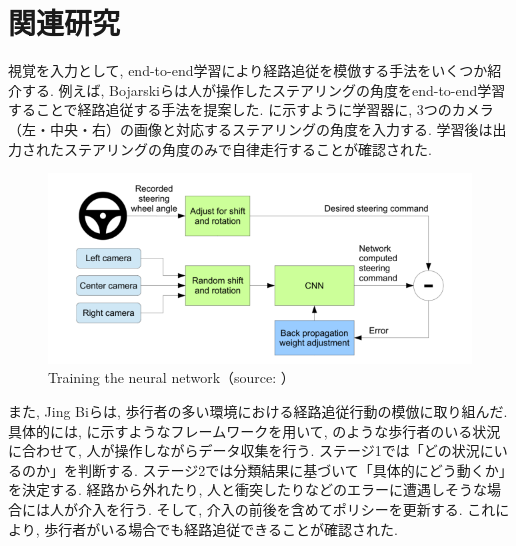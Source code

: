 \section{関連研究}
視覚を入力として, end-to-end学習により経路追従を模倣する手法をいくつか紹介する. 例えば, Bojarskiらは人が操作したステアリングの角度をend-to-end学習することで経路追従する手法を提案した. に示すように学習器に, 3つのカメラ（左・中央・右）の画像と対応するステアリングの角度を入力する. 学習後は出力されたステアリングの角度のみで自律走行することが確認された\cite{bojaski}. 

\begin{figure}[h]
     \centering
     \includegraphics[keepaspectratio, scale=0.45]
     {images/bojaski.png}
     \caption{Training the neural network（source: \cite{bojaski}）}
     \label{Fig:bojaski}
     \end{figure}

また, Jing Biらは, 歩行者の多い環境における経路追従行動の模倣に取り組んだ. 具体的には, に示すようなフレームワークを用いて, のような歩行者のいる状況に合わせて, 人が操作しながらデータ収集を行う. ステージ1では「どの状況にいるのか」を判断する. ステージ2では分類結果に基づいて「具体的にどう動くか」を決定する. 経路から外れたり, 人と衝突したりなどのエラーに遭遇しそうな場合には人が介入を行う. そして, 介入の前後を含めてポリシーを更新する. これにより, 歩行者がいる場合でも経路追従できることが確認された\cite{Jing}. 

